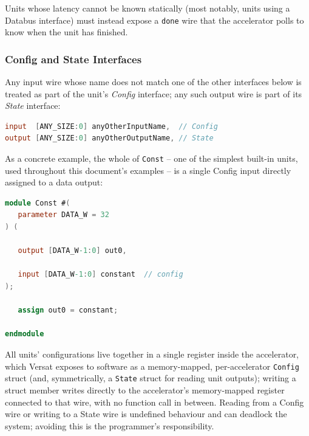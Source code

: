 Units whose latency cannot be known statically (most notably, units using
a Databus interface) must instead expose a \texttt{done} wire that the
accelerator polls to know when the unit has finished.

\subsubsection*{Config and State Interfaces}
\label{sec:if_config_state}

Any input wire whose name does not match one of the other interfaces below
is treated as part of the unit's \emph{Config} interface; any such output
wire is part of its \emph{State} interface:

\begin{lstlisting}[language=Verilog,caption={Any wire not matching another interface's naming pattern is Config or State.},label={lst:if_config_state}]
input  [ANY_SIZE:0] anyOtherInputName,  // Config
output [ANY_SIZE:0] anyOtherOutputName, // State
\end{lstlisting}

As a concrete example, the whole of \texttt{Const} -- one of the simplest
built-in units, used throughout this document's examples -- is a single
Config input directly assigned to a data output:

\begin{lstlisting}[language=Verilog,caption={\texttt{hardware/src/units/Const.v}: a minimal unit exposing a single Config wire (\texttt{constant}) and a single data output (\texttt{out0}).},label={lst:const_unit}]
module Const #(
   parameter DATA_W = 32
) (

   output [DATA_W-1:0] out0,

   input [DATA_W-1:0] constant  // config
);

   assign out0 = constant;

endmodule
\end{lstlisting}

All units' configurations live together in a single register inside the
accelerator, which Versat exposes to software as a memory-mapped,
per-accelerator \texttt{Config} struct (and, symmetrically, a
\texttt{State} struct for reading unit outputs); writing a struct member
writes directly to the accelerator's memory-mapped register connected to
that wire, with no function call in between. Reading from a Config wire or
writing to a State wire is undefined behaviour and can deadlock the system;
avoiding this is the programmer's responsibility.

